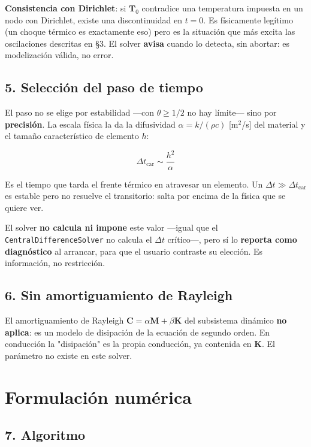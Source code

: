 \documentclass[11pt,letterpaper,oneside]{report}
\begin{document}
\textbf{Consistencia con Dirichlet}: si $\mathbf T_0$ contradice una temperatura impuesta en un nodo con Dirichlet, existe una discontinuidad en $t=0$. Es físicamente legítimo (un choque térmico es exactamente eso) pero es la situación que más excita las oscilaciones descritas en §3. El solver \textbf{avisa} cuando lo detecta, sin abortar: es modelización válida, no error.

\subsection{5. Selección del paso de tiempo}

El paso no se elige por estabilidad ---con $\theta \ge 1/2$ no hay límite--- sino por \textbf{precisión}. La escala física la da la difusividad $\alpha = k/(\rho c)$ [m\ensuremath{^{2}}/s] del material y el tamaño característico de elemento $h$:

\[
\Delta t_{\text{car}} \sim \frac{h^2}{\alpha}
\]

Es el tiempo que tarda el frente térmico en atravesar un elemento. Un $\Delta t \gg \Delta t_{\text{car}}$ es estable pero no resuelve el transitorio: salta por encima de la física que se quiere ver.

El solver \textbf{no calcula ni impone} este valor ---igual que el \texttt{CentralDifferenceSolver} no calcula el $\Delta t$ crítico---, pero sí lo \textbf{reporta como diagnóstico} al arrancar, para que el usuario contraste su elección. Es información, no restricción.

\subsection{6. Sin amortiguamiento de Rayleigh}

El amortiguamiento de Rayleigh $\mathbf C = \alpha\mathbf M + \beta\mathbf K$ del subsistema dinámico \textbf{no aplica}: es un modelo de disipación de la ecuación de segundo orden. En conducción la "disipación" es la propia conducción, ya contenida en $\mathbf K$. El parámetro no existe en este solver.


\section{Formulación numérica}

\subsection{7. Algoritmo}
\end{document}
